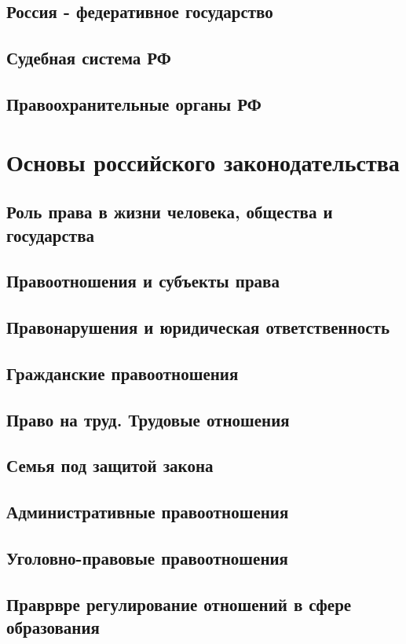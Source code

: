 \documentclass[a4paper, 12pt]{article}
\begin{document}
        \subsection{Россия - федеративное государство}
        \subsection{Судебная система РФ}
        \subsection{Правоохранительные органы РФ}
    \section{Основы российского законодательства}
        \subsection{Роль права в жизни человека, общества и государства}
        \subsection{Правоотношения и субъекты права}
        \subsection{Правонарушения и юридическая ответственность}
        \subsection{Гражданские правоотношения}
        \subsection{Право на труд. Трудовые отношения}
        \subsection{Семья под защитой закона}
        \subsection{Административные правоотношения}
        \subsection{Уголовно-правовые правоотношения}
        \subsection{Праврвре регулирование отношений в сфере образования}
\end{document}

